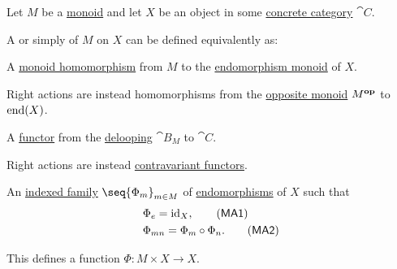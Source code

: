 \begin{definition}\label{def:monoid_action}\mimprovised
  Let \( M \) be a \hyperref[def:monoid]{monoid} and let \( X \) be an object in some \hyperref[def:concrete_category]{concrete category} \( \cat{C} \).

  A  or simply  of \( M \) on \( X \) can be defined equivalently as:
  \begin{thmenum}
     A \hyperref[def:monoid/homomorphism]{monoid homomorphism} from \( M \) to the \hyperref[def:endomorphism_monoid]{endomorphism monoid} of \( X \).

    Right actions are instead homomorphisms from the \hyperref[def:monoid/opposite]{opposite monoid} \( M^\oppos \) to \( \operatorname{end}(X) \).

     A \hyperref[def:functor]{functor} from the \hyperref[def:monoid_delooping]{delooping} \( \cat{B}_M \) to \( \cat{C} \).

    Right actions are instead \hyperref[rem:contravariant_functor]{contravariant functors}.

     An \hyperref[def:cartesian_product/indexed_family]{indexed family} \( \seq{ \Phi_m }_{m \in M} \) of \hyperref[def:morphism_invertibility/endomorphism]{endomorphisms} of \( X \) such that
    \begin{align}
      &\Phi_e = \id_X, \label{eq:def:monoid_action/family/identity}\tag{\logic{MA1}} \\
      &\Phi_{mn} = \Phi_m \bincirc \Phi_n. \label{eq:def:monoid_action/family/compatibility}\tag{\logic{MA2}}
    \end{align}

    This defines a function \( \Phi: M \times X \to X \).
  \end{thmenum}
\end{definition}
